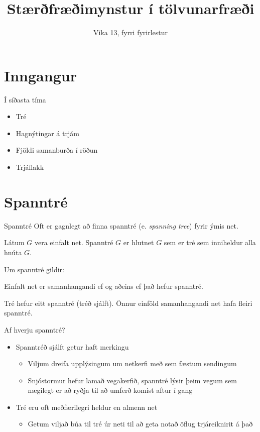\documentclass[handout]{beamer}
\title{Stærðfræðimynstur í tölvunarfræði}
\subtitle{Vika 13, fyrri fyrirlestur}
\begin{document}
\begin{frame}
\titlepage
\end{frame}


\section{Inngangur}

\begin{frame}{Í síðasta tíma}
\begin{itemize}
 \item Tré
 \item Hagnýtingar á trjám
 \item Fjöldi samanburða í röðun
 \item Trjáflakk
\end{itemize}
\end{frame}

\section{Spanntré}

\begin{frame}{Spanntré}
Oft er gagnlegt að finna spanntré (e. \emph{spanning tree}) fyrir ýmis net.
\begin{tcolorbox}[title=Spanntré]
Látum $G$ vera einfalt net. Spanntré $G$ er hlutnet $G$ sem er tré sem inniheldur alla hnúta $G$.
\end{tcolorbox}
Um spanntré gildir:
\begin{tcolorbox}
Einfalt net er samanhangandi ef og aðeins ef það hefur spanntré.
\end{tcolorbox}
Tré hefur eitt spanntré (tréð sjálft). Önnur einföld samanhangandi net hafa fleiri spanntré.
\end{frame}

\begin{frame}{Af hverju spanntré?}
\begin{itemize}
    \item Spanntréð sjálft getur haft merkingu
    \begin{itemize}
        \item Viljum dreifa upplýsingum um netkerfi með sem fæstum sendingum
        \item Snjóstormur hefur lamað vegakerfið, spanntré lýsir þeim vegum sem nægilegt er að ryðja til að umferð komist aftur í gang
    \end{itemize}
    \item Tré eru oft meðfærilegri heldur en almenn net
    \begin{itemize}
        \item Getum viljað búa til tré úr neti til að geta notað öflug trjáreiknirit á það
    \end{itemize}
\end{itemize}
\end{frame}
\end{document}
